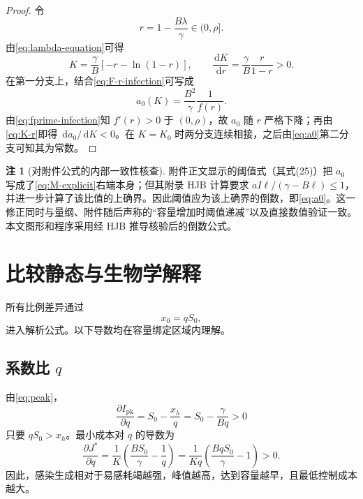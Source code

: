 \documentclass[11pt,a4paper,UTF8]{ctexart}
\theoremstyle{definition}
\newtheorem{remark}[theorem]{注}
\newcommand{\dd}{\,\mathrm{d}}
\begin{document}
\begin{proof}
令
\begin{equation}
r=1-\frac{B\lambda}{\gamma}\in(0,\rho].
\label{eq:r-lambda}
\end{equation}
由\eqref{eq:lambda-equation}可得
\begin{equation}
K=\frac{\gamma}{B}\left[-r-\ln(1-r)\right],
\qquad
\frac{\dd K}{\dd r}=\frac{\gamma}{B}\frac{r}{1-r}>0.
\label{eq:K-r}
\end{equation}
在第一分支上，结合\eqref{eq:F-r-infection}可写成
\begin{equation}
a_0(K)=\frac{B^2}{\gamma}\frac1{f(r)}.
\label{eq:a0-r-correct}
\end{equation}
由\eqref{eq:fprime-infection}知 $f'(r)>0$ 于 $(0,\rho)$，故 $a_0$ 随 $r$ 严格下降；再由\eqref{eq:K-r}即得 $\dd a_0/\dd K<0$。在 $K=K_0$ 时两分支连续相接，之后由\eqref{eq:a0}第二分支可知其为常数。
\end{proof}

\begin{remark}[对附件公式的内部一致性核查]
附件正文显示的阈值式（其式(25)）把 $a_0$ 写成了\eqref{eq:M-explicit}右端本身；但其附录 HJB 计算要求
$aI\ell/(\gamma-B\ell)\le1$，并进一步计算了该比值的上确界。因此阈值应为该上确界的倒数，即\eqref{eq:a0}。这一修正同时与量纲、附件随后声称的“容量增加时阈值递减”以及直接数值验证一致。本文图形和程序采用经 HJB 推导核验后的倒数公式。
\end{remark}

\section{比较静态与生物学解释}

所有比例差异通过
\begin{equation}
x_0=qS_0,
\label{eq:q-x0}
\end{equation}
进入解析公式。以下导数均在容量绑定区域内理解。

\subsection{系数比 \texorpdfstring{$q$}{q}}
由\eqref{eq:peak}，
\begin{equation}
\frac{\partial I_{\mathrm{pk}}}{\partial q}
=S_0-\frac{x_h}{q}
=S_0-\frac{\gamma}{Bq}>0
\label{eq:peak-q-derivative}
\end{equation}
只要 $qS_0>x_h$。最小成本对 $q$ 的导数为
\begin{equation}
\frac{\partial J^*}{\partial q}
=\frac1K\left(\frac{BS_0}{\gamma}-\frac1q\right)
=\frac{1}{Kq}\left(\frac{BqS_0}{\gamma}-1\right)>0.
\label{eq:cost-q-derivative}
\end{equation}
因此，感染生成相对于易感耗竭越强，峰值越高，达到容量越早，且最低控制成本越大。
\end{document}
